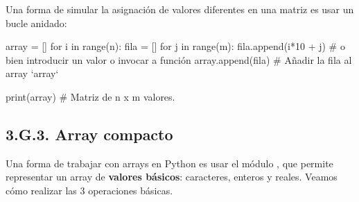 Una forma de simular la asignación de valores diferentes en una matriz es usar un bucle anidado:
\begin{pyconsole}[][frame=single]
array = []
for i in range(n):
    fila = []
    for j in range(m):
        fila.append(i*10 + j) # o bien introducir un valor o invocar a función
    array.append(fila)  # Añadir la fila al array `array` 

print(array)   # Matriz de n x m valores.

\end{pyconsole}




\subsection*{3.G.3. Array compacto}


Una forma de trabajar con arrays en Python es usar el módulo , que permite representar un array de \textbf{valores básicos}: caracteres, enteros y reales. 
Veamos cómo realizar las 3 operaciones básicas.\\

